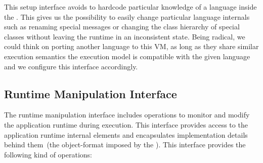 This \VM setup interface avoids to hardcode particular knowledge of a language inside the \VM. This gives us the possibility to easily change particular language internals such as renaming special messages or changing the class hierarchy of special classes without leaving the runtime in an inconsistent state. Being radical, we could think on porting another language to this VM, as long as they share similar execution semantics \ie the \VM execution model is compatible with the given language and we configure this interface accordingly.



\subsection{Runtime Manipulation Interface} 
The runtime manipulation interface includes operations to monitor and modify the application runtime during execution. This interface provides access to the application runtime internal elements and encapsulates implementation details behind them~(\ie the object-format imposed by the \VM). This interface provides the following kind of operations:

